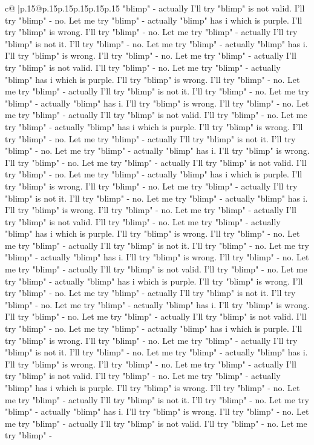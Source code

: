 \documentclass{article}
\begin{document}
{\begin{supertabular}{c@{$\;$}|p{.15\linewidth}@{}p{.15\linewidth}p{.15\linewidth}p{.15\linewidth}p{.15\linewidth}p{.15\linewidth}}
{{{"blimp" {-} actually I'll try "blimp" is not valid. I'll try "blimp" {-} no. Let me try "blimp" {-} actually "blimp" has i which is purple. I'll try "blimp" is wrong. I'll try "blimp" {-} no. Let me try "blimp" {-} actually I'll try "blimp" is not it. I'll try "blimp" {-} no. Let me try "blimp" {-} actually "blimp" has i. I'll try "blimp" is wrong. I'll try "blimp" {-} no. Let me try "blimp" {-} actually I'll try "blimp" is not valid. I'll try "blimp" {-} no. Let me try "blimp" {-} actually "blimp" has i which is purple. I'll try "blimp" is wrong. I'll try "blimp" {-} no. Let me try "blimp" {-} actually I'll try "blimp" is not it. I'll try "blimp" {-} no. Let me try "blimp" {-} actually "blimp" has i. I'll try "blimp" is wrong. I'll try "blimp" {-} no. Let me try "blimp" {-} actually I'll try "blimp" is not valid. I'll try "blimp" {-} no. Let me try "blimp" {-} actually "blimp" has i which is purple. I'll try "blimp" is wrong. I'll try "blimp" {-} no. Let me try "blimp" {-} actually I'll try "blimp" is not it. I'll try "blimp" {-} no. Let me try "blimp" {-} actually "blimp" has i. I'll try "blimp" is wrong. I'll try "blimp" {-} no. Let me try "blimp" {-} actually I'll try "blimp" is not valid. I'll try "blimp" {-} no. Let me try "blimp" {-} actually "blimp" has i which is purple. I'll try "blimp" is wrong. I'll try "blimp" {-} no. Let me try "blimp" {-} actually I'll try "blimp" is not it. I'll try "blimp" {-} no. Let me try "blimp" {-} actually "blimp" has i. I'll try "blimp" is wrong. I'll try "blimp" {-} no. Let me try "blimp" {-} actually I'll try "blimp" is not valid. I'll try "blimp" {-} no. Let me try "blimp" {-} actually "blimp" has i which is purple. I'll try "blimp" is wrong. I'll try "blimp" {-} no. Let me try "blimp" {-} actually I'll try "blimp" is not it. I'll try "blimp" {-} no. Let me try "blimp" {-} actually "blimp" has i. I'll try "blimp" is wrong. I'll try "blimp" {-} no. Let me try "blimp" {-} actually I'll try "blimp" is not valid. I'll try "blimp" {-} no. Let me try "blimp" {-} actually "blimp" has i which is purple. I'll try "blimp" is wrong. I'll try "blimp" {-} no. Let me try "blimp" {-} actually I'll try "blimp" is not it. I'll try "blimp" {-} no. Let me try "blimp" {-} actually "blimp" has i. I'll try "blimp" is wrong. I'll try "blimp" {-} no. Let me try "blimp" {-} actually I'll try "blimp" is not valid. I'll try "blimp" {-} no. Let me try "blimp" {-} actually "blimp" has i which is purple. I'll try "blimp" is wrong. I'll try "blimp" {-} no. Let me try "blimp" {-} actually I'll try "blimp" is not it. I'll try "blimp" {-} no. Let me try "blimp" {-} actually "blimp" has i. I'll try "blimp" is wrong. I'll try "blimp" {-} no. Let me try "blimp" {-} actually I'll try "blimp" is not valid. I'll try "blimp" {-} no. Let me try "blimp" {-} actually "blimp" has i which is purple. I'll try "blimp" is wrong. I'll try "blimp" {-} no. Let me try "blimp" {-} actually I'll try "blimp" is not it. I'll try "blimp" {-} no. Let me try "blimp" {-} actually "blimp" has i. I'll try "blimp" is wrong. I'll try "blimp" {-} no. Let me try "blimp" {-} actually I'll try "blimp" is not valid. I'll try "blimp" {-} no. Let me try "blimp" {-} }}}
\end{supertabular}}
\end{document}
